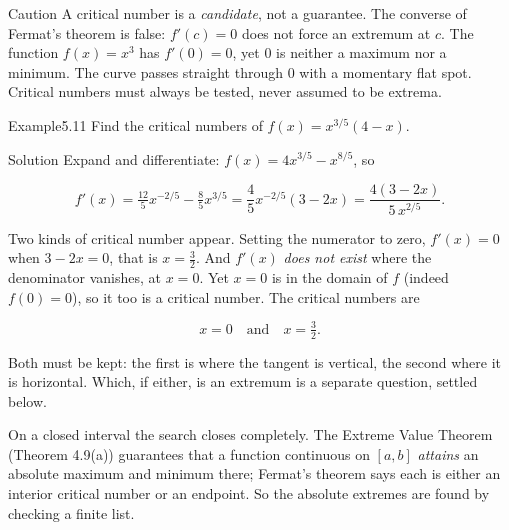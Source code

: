 \documentclass[a4paper,12pt,oneside]{memoir}
\begin{document}
\begin{envcaution}{Caution}{}{}
A critical number is a \emph{candidate}, not a guarantee. The converse of Fermat’s theorem is false: \(f'(c) = 0\) does not force an extremum at \(c\). The function \(f(x) = x^{3}\) has \(f'(0) = 0\), yet \(0\) is neither a maximum nor a minimum. The curve passes straight through \(0\) with a momentary flat spot. Critical numbers must always be tested, never assumed to be extrema.
\end{envcaution}
\begin{workedexample}
\begin{envexample}{Example}{5.11}{}
Find the critical numbers of \(f(x) = x^{3/5}(4 - x)\).
\end{envexample}
\begin{envsolution}{Solution}{}{}
Expand and differentiate: \(f(x) = 4x^{3/5} - x^{8/5}\), so

\[ f'(x) = \tfrac{12}{5}x^{-2/5} - \tfrac{8}{5}x^{3/5} = \frac{4}{5}x^{-2/5}(3 - 2x) = \frac{4(3 - 2x)}{5\,x^{2/5}}. \]

Two kinds of critical number appear. Setting the numerator to zero, \(f'(x) = 0\) when \(3 - 2x = 0\), that is \(x = \tfrac{3}{2}\). And \(f'(x)\) \emph{does not exist} where the denominator vanishes, at \(x = 0\). Yet \(x = 0\) is in the domain of \(f\) (indeed \(f(0) = 0\)), so it too is a critical number. The critical numbers are

\[ x = 0 \quad\text{and}\quad x = \tfrac{3}{2}. \]

Both must be kept: the first is where the tangent is vertical, the second where it is horizontal. Which, if either, is an extremum is a separate question, settled below. \qedmark
\end{envsolution}
\end{workedexample}
On a closed interval the search closes completely. The Extreme Value Theorem (Theorem 4.9(a)) guarantees that a function continuous on \([a, b]\) \emph{attains} an absolute maximum and minimum there; Fermat’s theorem says each is either an interior critical number or an endpoint. So the absolute extremes are found by checking a finite list.
\end{document}
